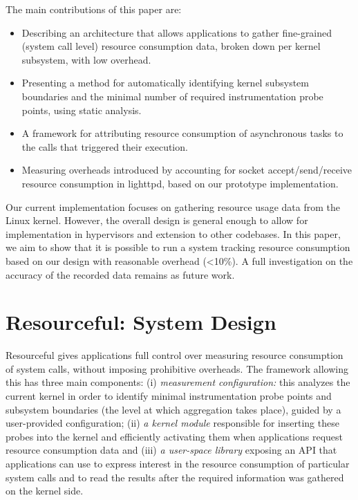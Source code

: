\documentclass[letterpaper,twocolumn,10pt]{article}
\newcommand{\pname}{Resourceful}
\begin{document}
The main contributions of this paper are: 

\begin{itemize} 
\item Describing an architecture that allows applications to gather fine-grained
(system call level) resource consumption data, broken down per kernel subsystem,
with low overhead.
\item Presenting a method for automatically identifying kernel subsystem
boundaries and the minimal number of required instrumentation probe points,
using static analysis.
\item A framework for attributing resource consumption of asynchronous
tasks to the calls that triggered their execution.
\item Measuring overheads introduced by accounting for socket
accept/send/receive resource consumption in lighttpd, based on our prototype
implementation.
\end{itemize}

Our current implementation focuses on gathering resource usage data from the
Linux kernel.  However, the overall design is general enough to allow for
implementation in hypervisors and extension to other codebases. 
In this paper, we aim to show that it is possible to run a system tracking
resource consumption based on our design with reasonable overhead (\textless 10\%). A
full investigation on the accuracy of the recorded data remains as future work.


\section{\pname: System Design} 

\pname{ }gives applications full control over measuring resource consumption of
system calls, without imposing prohibitive overheads. The framework allowing
this has three main components: (i) \textit{measurement configuration:} this
analyzes the current kernel in order to identify minimal instrumentation probe
points and subsystem boundaries (the level at which aggregation takes place),
guided by a user-provided configuration; (ii) \textit{a kernel module} responsible for
inserting these probes into the kernel and efficiently activating them when
applications request resource consumption data and (iii) \textit{a user-space library}
exposing an API that applications can use to express interest in the resource
consumption of particular system calls and to read the results after the
required information was gathered on the kernel side.
\end{document}
